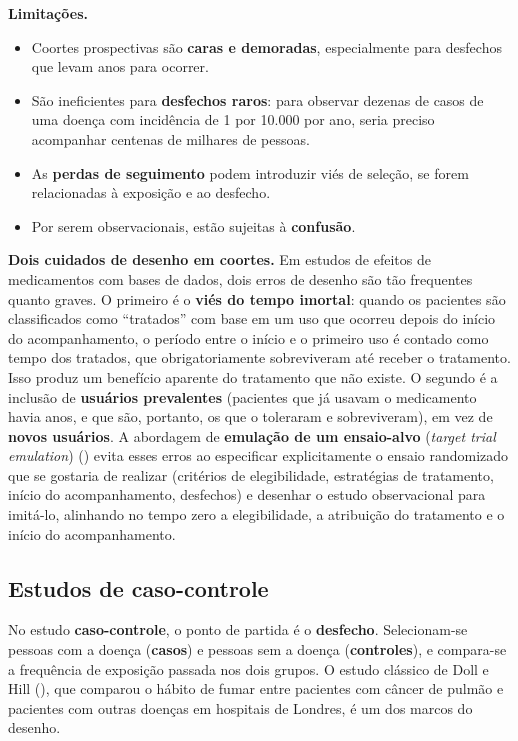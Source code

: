\documentclass[
]{book}
\providecommand{\tightlist}{%
  \setlength{\itemsep}{0pt}\setlength{\parskip}{0pt}}
\begin{document}
\textbf{Limitações.}

\begin{itemize}
\tightlist
\item
  Coortes prospectivas são \textbf{caras e demoradas}, especialmente para desfechos que levam anos para ocorrer.
\item
  São ineficientes para \textbf{desfechos raros}: para observar dezenas de casos de uma doença com incidência de 1 por 10.000 por ano, seria preciso acompanhar centenas de milhares de pessoas.
\item
  As \textbf{perdas de seguimento} podem introduzir viés de seleção, se forem relacionadas à exposição e ao desfecho.
\item
  Por serem observacionais, estão sujeitas à \textbf{confusão}.
\end{itemize}

\textbf{Dois cuidados de desenho em coortes.} Em estudos de efeitos de medicamentos com bases de dados, dois erros de desenho são tão frequentes quanto graves. O primeiro é o \textbf{viés do tempo imortal}: quando os pacientes são classificados como ``tratados'' com base em um uso que ocorreu depois do início do acompanhamento, o período entre o início e o primeiro uso é contado como tempo dos tratados, que obrigatoriamente sobreviveram até receber o tratamento. Isso produz um benefício aparente do tratamento que não existe. O segundo é a inclusão de \textbf{usuários prevalentes} (pacientes que já usavam o medicamento havia anos, e que são, portanto, os que o toleraram e sobreviveram), em vez de \textbf{novos usuários}. A abordagem de \textbf{emulação de um ensaio-alvo} (\emph{target trial emulation}) () evita esses erros ao especificar explicitamente o ensaio randomizado que se gostaria de realizar (critérios de elegibilidade, estratégias de tratamento, início do acompanhamento, desfechos) e desenhar o estudo observacional para imitá-lo, alinhando no tempo zero a elegibilidade, a atribuição do tratamento e o início do acompanhamento.

\subsection{Estudos de caso-controle}\label{estudos-de-caso-controle}

No estudo \textbf{caso-controle}, o ponto de partida é o \textbf{desfecho}. Selecionam-se pessoas com a doença (\textbf{casos}) e pessoas sem a doença (\textbf{controles}), e compara-se a frequência de exposição passada nos dois grupos. O estudo clássico de Doll e Hill (), que comparou o hábito de fumar entre pacientes com câncer de pulmão e pacientes com outras doenças em hospitais de Londres, é um dos marcos do desenho.
\end{document}
